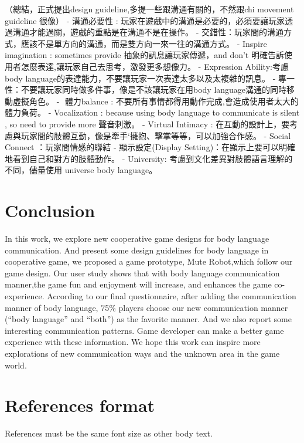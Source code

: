 \documentclass{sigchi}
\begin{document}
（總結，正式提出design guideline,多提一些跟溝通有關的，不然跟chi movement guideline 很像）
-  溝通必要性 : 玩家在遊戲中的溝通是必要的，必須要讓玩家透過溝通才能過關，遊戲的重點是在溝通不是在操作。
- 交錯性：玩家間的溝通方式，應該不是單方向的溝通，而是雙方向一來一往的溝通方式。
-  Inspire imagination : sometimes provide 抽象的訊息讓玩家傳遞，and don’t 明確告訴使用者怎麼表達,讓玩家自己去思考，激發更多想像力。
-­ Expression Ability:考慮body language的表達能力，不要讓玩家一次表達太多以及太複雜的訊息。
-  專一性：不要讓玩家同時做多件事，像是不該讓玩家在用body language溝通的同時移動虛擬角色。
- ­ 體力balance : 不要所有事情都得用動作完成,會造成使用者太大的體力負荷。
­- Vocalization : because using body language to communicate is silent , so need to provide more 聲音刺激。
- Virtual Intimacy : 在互動的設計上，要考慮與玩家間的肢體互動，像是牽手‘擁抱、擊掌等等，可以加強合作感。
- Social Connect ：玩家間情感的聯結
- 顯示設定(Display Setting)：在顯示上要可以明確地看到自己和對方的肢體動作。
- University: 考慮到文化差異對肢體語言理解的不同，儘量使用 universe body language。

\section{Conclusion}

In this work, we explore new cooperative game designs for body language communication. 
  And present some design guidelines for body language in cooperative game, we proposed a game prototype, Mute Robot,which follow our game design. Our user study shows that with body language communication manner,the game fun and enjoyment will increase, and enhances the game co-experience. According to our final questionnaire, after adding the communication manner of body language, 75\% players choose our new communication manner (“body language” and “both”) as the favorite manner. And we also report some interesting communication patterns. Game developer can make a better game experience with these information. We hope this work can inspire more explorations of new communication ways and the unknown area in the game world.

\balance

\section{References format}
References must be the same font size as other body text.



\end{document}
